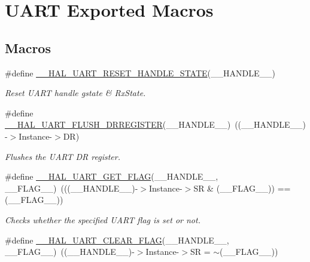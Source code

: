 \hypertarget{group___u_a_r_t___exported___macros}{}\section{U\+A\+RT Exported Macros}
\label{group___u_a_r_t___exported___macros}
\subsection*{Macros}
\begin{DoxyCompactItemize}
\item 
\#define \mbox{\hyperlink{group___u_a_r_t___exported___macros_ga19deab848407b106998416c78092fa9b}{\+\_\+\+\_\+\+H\+A\+L\+\_\+\+U\+A\+R\+T\+\_\+\+R\+E\+S\+E\+T\+\_\+\+H\+A\+N\+D\+L\+E\+\_\+\+S\+T\+A\+TE}}(\+\_\+\+\_\+\+H\+A\+N\+D\+L\+E\+\_\+\+\_\+)
\begin{DoxyCompactList}\small\item\em Reset U\+A\+RT handle gstate \& Rx\+State. \end{DoxyCompactList}\item 
\#define \mbox{\hyperlink{group___u_a_r_t___exported___macros_gafc4f20cb0f29ba146c9bc14167c52744}{\+\_\+\+\_\+\+H\+A\+L\+\_\+\+U\+A\+R\+T\+\_\+\+F\+L\+U\+S\+H\+\_\+\+D\+R\+R\+E\+G\+I\+S\+T\+ER}}(\+\_\+\+\_\+\+H\+A\+N\+D\+L\+E\+\_\+\+\_\+)~((\+\_\+\+\_\+\+H\+A\+N\+D\+L\+E\+\_\+\+\_\+)-\/$>$Instance-\/$>$DR)
\begin{DoxyCompactList}\small\item\em Flushes the U\+A\+RT DR register. \end{DoxyCompactList}\item 
\#define \mbox{\hyperlink{group___u_a_r_t___exported___macros_ga261fe8a2afe84ec048113654266c5bf6}{\+\_\+\+\_\+\+H\+A\+L\+\_\+\+U\+A\+R\+T\+\_\+\+G\+E\+T\+\_\+\+F\+L\+AG}}(\+\_\+\+\_\+\+H\+A\+N\+D\+L\+E\+\_\+\+\_\+,  \+\_\+\+\_\+\+F\+L\+A\+G\+\_\+\+\_\+)~(((\+\_\+\+\_\+\+H\+A\+N\+D\+L\+E\+\_\+\+\_\+)-\/$>$Instance-\/$>$SR \& (\+\_\+\+\_\+\+F\+L\+A\+G\+\_\+\+\_\+)) == (\+\_\+\+\_\+\+F\+L\+A\+G\+\_\+\+\_\+))
\begin{DoxyCompactList}\small\item\em Checks whether the specified U\+A\+RT flag is set or not. \end{DoxyCompactList}\item 
\#define \mbox{\hyperlink{group___u_a_r_t___exported___macros_ga9bd035161d41cde4f2568c7af06493bf}{\+\_\+\+\_\+\+H\+A\+L\+\_\+\+U\+A\+R\+T\+\_\+\+C\+L\+E\+A\+R\+\_\+\+F\+L\+AG}}(\+\_\+\+\_\+\+H\+A\+N\+D\+L\+E\+\_\+\+\_\+,  \+\_\+\+\_\+\+F\+L\+A\+G\+\_\+\+\_\+)~((\+\_\+\+\_\+\+H\+A\+N\+D\+L\+E\+\_\+\+\_\+)-\/$>$Instance-\/$>$SR = $\sim$(\+\_\+\+\_\+\+F\+L\+A\+G\+\_\+\+\_\+))

\end{DoxyCompactItemize}

